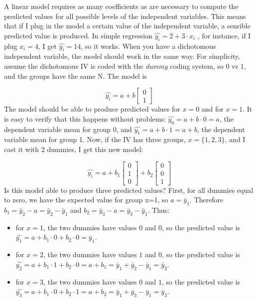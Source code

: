 \documentclass[
]{book}
\begin{document}
A linear model requires as many coefficients as are necessary to compute the predicted values for all possible levels of the independent variables. This means that if I plug in the model a certain value of the independent variable, a sensible predicted value is produced. In simple regression \(\hat{y_i}=2+3 \cdot x_i\) , for instance, if I plug \(x_i=4\), I get \(\hat{y_i}=14\), so it works. When you have a dichotomous independent variable, the model should work in the same way. For simplicity, assume the dichotomous IV is coded with the \emph{dummy} coding system, so 0 vs 1, and the groups have the same N. The model is

\[
\hat{y_i}=a+b \begin{bmatrix}
0 \\
1
\end{bmatrix}
\]
The model should be able to produce predicted values for \(x=0\) and for \(x=1\). It is easy to verify that this happens without problems: \(\hat{y_0}=a+b \cdot 0=a\), the dependent variable mean for group 0, and \(\hat{y_1}=a+b \cdot 1=a+b\), the dependent variable mean for group 1. Now, if the IV has three groups, \(x=\{1,2,3\}\), and I cast it with 2 dummies, I get this new model:

\[
\hat{y_i}=a+b_1 \begin{bmatrix}
0 \\
1 \\
0
\end{bmatrix} +b_2 \begin{bmatrix}
0 \\
0 \\
1
\end{bmatrix}
\]
Is this model able to produce three predicted values? First, for all dummies equal to zero, we have the expected value for group x=1, so \(a=\bar{y}_1\). Therefore \(b_1=\bar{y}_2-a=\bar{y}_2-\bar{y}_1\) and \(b_2=\bar{y}_3-a=\bar{y}_3-\bar{y}_1\). Thus:

\begin{itemize}
\item
  for \(x=1\), the two dummies have values \(0\) and \(0\), so the predicted value is \(\hat{y_1}=a+b_1 \cdot 0 +b_2 \cdot 0 =\bar{y}_1\).
\item
  for \(x=2\), the two dummies have values \(1\) and \(0\), so the predicted value is \(\hat{y_2}=a+b_1 \cdot 1 +b_2 \cdot 0 =a+b_1=\bar{y}_1+\bar{y}_2-\bar{y}_1=\bar{y}_2\).
\item
  for \(x=3\), the two dummies have values \(0\) and \(1\), so the predicted value is \(\hat{y_3}=a+b_1 \cdot 0 +b_2 \cdot 1 =a+b_2=\bar{y}_1+\bar{y}_3-\bar{y}_1=\bar{y}_3\).
\end{itemize}
\end{document}
